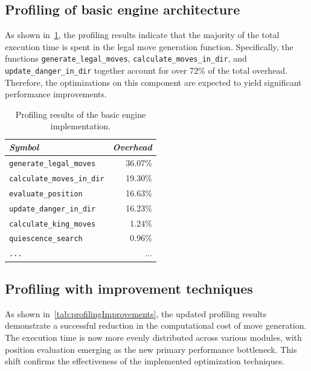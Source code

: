 \subsection*{Profiling of basic engine architecture}

\noindent As shown in~\cref{tab:profilingBasic}, the profiling results indicate that the majority of the total execution time is spent in the legal move generation function. Specifically, the functions \texttt{generate\_legal\_moves}, \texttt{calculate\_moves\_in\_dir}, and \texttt{update\_danger\_in\_dir} together account for over 72\% of the total overhead. Therefore, the optimizations on this component are expected to yield significant performance improvements.

\begin{table}[H]
    \centering
    \begin{tabular}{|l|r|}
    \hline
    \textit{Symbol} & \textit{Overhead} \\
    \hline
    \texttt{generate\_legal\_moves}       &  36.07\% \\
    \texttt{calculate\_moves\_in\_dir}    &  19.30\% \\
    \texttt{evaluate\_position}          &  16.63\% \\
    \texttt{update\_danger\_in\_dir}      &   16.23\% \\
    \texttt{calculate\_king\_moves}       &   1.24\% \\
    \texttt{quiescence\_search}          &   0.96\% \\
    \texttt{...}                          &   ...     \\
    \hline
    \end{tabular}
    \caption{Profiling results of the basic engine implementation.}
    \label{tab:profilingBasic}
\end{table}

\vspace{1em}

\subsection*{Profiling with improvement techniques}

\noindent As shown in~\cref{tab:profilingImprovements}, the updated profiling results demonstrate a successful reduction in the computational cost of move generation. The execution time is now more evenly distributed across various modules, with position evaluation emerging as the new primary performance bottleneck. This shift confirms the effectiveness of the implemented optimization techniques.

